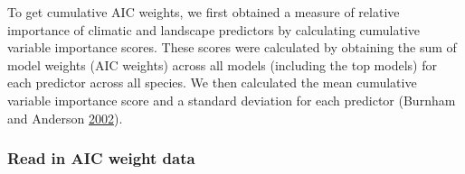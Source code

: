 \documentclass[
]{article}
\begin{document}
To get cumulative AIC weights, we first obtained a measure of relative importance of climatic and landscape predictors by calculating cumulative variable importance scores. These scores were calculated by obtaining the sum of model weights (AIC weights) across all models (including the top models) for each predictor across all species. We then calculated the mean cumulative variable importance score and a standard deviation for each predictor (Burnham and Anderson \protect\hyperlink{ref-burnham2002a}{2002}).

\hypertarget{read-in-aic-weight-data}{%
\subsubsection{Read in AIC weight data}\label{read-in-aic-weight-data}}
\end{document}

